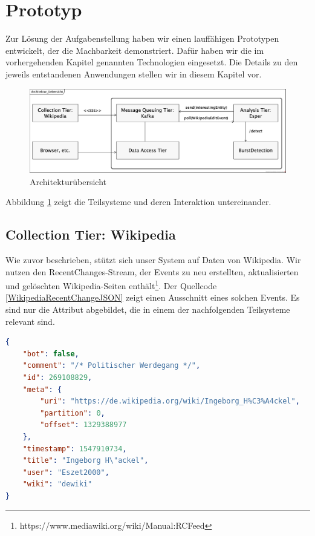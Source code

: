 \section{Prototyp}
Zur Lösung der Aufgabenstellung haben wir einen lauffähigen Prototypen entwickelt, der die Machbarkeit demonstriert.
Dafür haben wir die im vorhergehenden Kapitel genannten Technologien eingesetzt. Die Details zu den jeweils entstandenen
Anwendungen stellen wir in diesem Kapitel vor.

\begin{figure}
    \includegraphics[width=\textwidth]{images/Architektur_Uebersicht.png}
    \caption{Architekturübersicht}
    \label{fig:architektur_uebersicht}
\end{figure}

Abbildung \ref{fig:architektur_uebersicht} zeigt die Teilsysteme und deren Interaktion untereinander.


\subsection{Collection Tier: Wikipedia}
Wie zuvor beschrieben, stützt sich unser System auf Daten von Wikipedia. Wir nutzen den RecentChanges-Stream, der
Events zu neu erstellten, aktualisierten und gelöschten Wikipedia-Seiten enthält\footnote{https://www.mediawiki.org/wiki/Manual:RCFeed}.
Der Quellcode \ref{WikipediaRecentChangeJSON} zeigt einen Ausschnitt eines solchen Events.
Es sind nur die Attribut abgebildet, die in einem der nachfolgenden Teilsysteme relevant sind.

\begin{lstlisting}[label=WikipediaRecentChangeJSON,caption=Wikipedia RecentChange-Event,language=json,firstnumber=1,captionpos=b]
{
    "bot": false,
    "comment": "/* Politischer Werdegang */",
    "id": 269108829,
    "meta": {
        "uri": "https://de.wikipedia.org/wiki/Ingeborg_H%C3%A4ckel",
        "partition": 0,
        "offset": 1329388977
    },
    "timestamp": 1547910734,
    "title": "Ingeborg H\"ackel",
    "user": "Eszet2000",
    "wiki": "dewiki"
}
\end{lstlisting}

